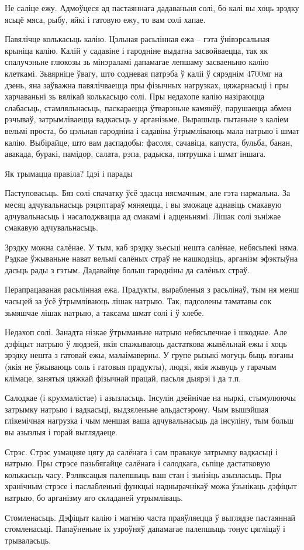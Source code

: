 Не саліце ежу.
Адмоўцеся ад пастаяннага дадаваньня солі, бо калі вы хоць зрэдку ясьцё мяса, рыбу, яйкі і гатовую ежу, то вам солі хапае.

Павялічце колькасьць калію.
Цэльная расьлінная ежа – гэта ўнівэрсальная крыніца калію. Калій у садавіне і гародніне выдатна засвойваецца, так як спалучэньне глюкозы зь мінэраламі дапамагае лепшаму засваеньню калію клеткамі. Зьвярніце ўвагу, што содневая патрэба ў каліі ў сярэднім 4700мг на дзень, яна заўважна павялічваецца пры фізычных нагрузках, цяжарнасьці і пры харчаваньні зь вялікай колькасьцю солі. Пры недахопе калію назіраюцца слабасьць, стамляльнасьць, паскараецца ўтварэньне камянёў, парушаецца абмен рэчываў, затрымліваецца вадкасьць у арганізьме. Вырашыць пытаньне з каліем вельмі проста, бо цэльная гародніна і садавіна ўтрымліваюць мала натрыю і шмат калію. Выбірайце, што вам даспадобы: фасоля, сачавіца, капуста, бульба, банан, авакада, буракі, памідор, салата, рэпа, радыска, пятрушка і шмат іншага.

Як трымацца правіла? Ідэі і парады

Паступовасьць.
Бяз солі спачатку ўсё здасца нясмачным, але гэта нармальна. За месяц адчувальнасьць рэцэптараў мяняецца, і вы зможаце аднавіць смакавую адчувальнасьць і насалоджвацца ад смакамі і адценьнямі. Лішак солі зьніжае смакавую адчувальнасьць.

Зрэдку можна салёнае.
У тым, каб зрэдку зьесьці нешта салёнае, небясьпекі няма. Рэдкае ўжываньне нават вельмі салёных страў не нашкодзіць, арганізм эфэктыўна дасьць рады з гэтым. Дадавайце больш гародніны да салёных страў.

Перапрацаваная расьлінная ежа.
Прадукты, вырабленыя з расьлінаў, тым ня менш часьцей за ўсё ўтрымліваюць лішак натрыю. Так, падсолены таматавы сок зьмяшчае лішак натрыю, а таксама шмат солі і ў хлебе.

Недахоп солі.
Занадта нізкае ўтрыманьне натрыю небясьпечнае і шкоднае. Але дэфіцыт натрыю ў людзей, якія спажываюць дастаткова жывёльнай ежы і хоць зрэдку нешта з гатовай ежы, малаімаверны. У групе рызыкі могуць быць вэганы (якія не ўжываюць соль і гатовыя прадукты), людзі, якія жывуць у гарачым клімаце, занятыя цяжкай фізычнай працай, пасьля дыярэі і да т.п.

Салодкае (і крухмалістае) і азызласьць.
Інсулін дзейнічае на ныркі, стымулюючы затрымку натрыю і вадкасьці, выдзяленьне альдастэрону. Чым вышэйшая глікемічная нагрузка і чым меншая ваша адчувальнасьць да інсуліну, тым больш вы азызлыя і горай выглядаеце.

Стрэс.
Стрэс узмацняе цягу да салёнага і сам правакуе затрымку вадкасьці і натрыю. Пры стрэсе пазьбягайце салёнага і салодкага, сьпіце дастатковую колькасьць часу. Рэляксацыя палепшыць ваш стан і зьнізіць азызласьць. Пры хранічным стрэсе і паслабленьні функцыі наднырачнікаў можа ўзьнікаць дэфіцыт натрыю, бо арганізму яго складаней утрымліваць.

Стомленасьць.
Дэфіцыт калію і магнію часта праяўляецца ў выглядзе пастаяннай стомленасьці. Папаўненьне іх узроўняў дапамагае палепшыць тонус цягліцаў і трываласьць.
